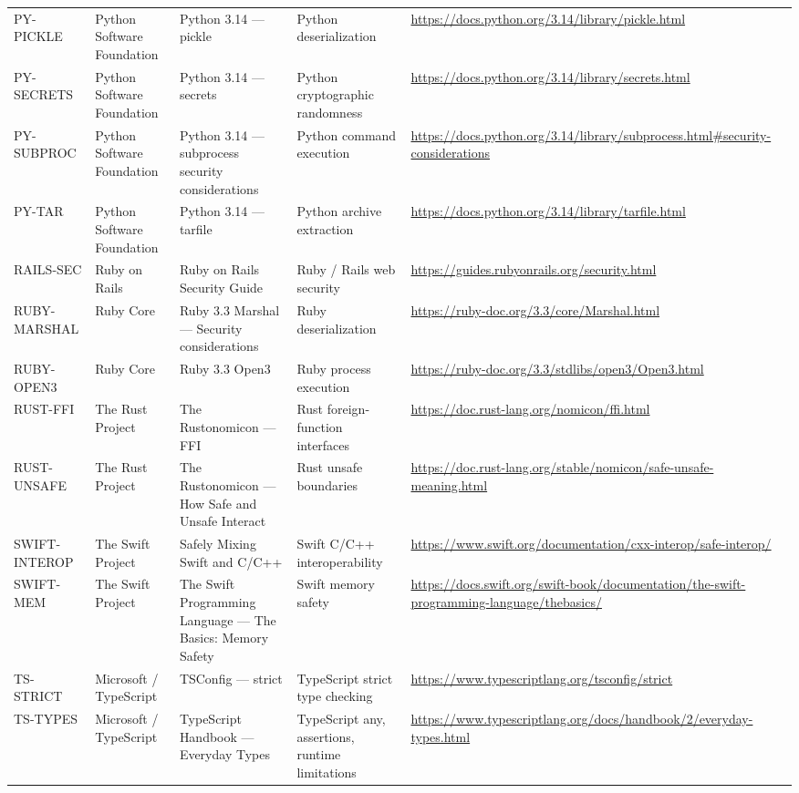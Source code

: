 \documentclass[10pt,letterpaper]{article}
\begin{document}
\begin{landscape}
\begin{longtable}{@{}P{0.82in}P{1.23in}P{2.25in}P{1.7in}P{3.0in}@{}}
PY-PICKLE & Python Software Foundation & Python 3.14 --- pickle & Python deserialization & \url{https://docs.python.org/3.14/library/pickle.html}\\
PY-SECRETS & Python Software Foundation & Python 3.14 --- secrets & Python cryptographic randomness & \url{https://docs.python.org/3.14/library/secrets.html}\\
PY-SUBPROC & Python Software Foundation & Python 3.14 --- subprocess security considerations & Python command execution & \url{https://docs.python.org/3.14/library/subprocess.html\#security-considerations}\\
PY-TAR & Python Software Foundation & Python 3.14 --- tarfile & Python archive extraction & \url{https://docs.python.org/3.14/library/tarfile.html}\\
RAILS-SEC & Ruby on Rails & Ruby on Rails Security Guide & Ruby / Rails web security & \url{https://guides.rubyonrails.org/security.html}\\
RUBY-MARSHAL & Ruby Core & Ruby 3.3 Marshal --- Security considerations & Ruby deserialization & \url{https://ruby-doc.org/3.3/core/Marshal.html}\\
RUBY-OPEN3 & Ruby Core & Ruby 3.3 Open3 & Ruby process execution & \url{https://ruby-doc.org/3.3/stdlibs/open3/Open3.html}\\
RUST-FFI & The Rust Project & The Rustonomicon --- FFI & Rust foreign-function interfaces & \url{https://doc.rust-lang.org/nomicon/ffi.html}\\
RUST-UNSAFE & The Rust Project & The Rustonomicon --- How Safe and Unsafe Interact & Rust unsafe boundaries & \url{https://doc.rust-lang.org/stable/nomicon/safe-unsafe-meaning.html}\\
SWIFT-INTEROP & The Swift Project & Safely Mixing Swift and C/C++ & Swift C/C++ interoperability & \url{https://www.swift.org/documentation/cxx-interop/safe-interop/}\\
SWIFT-MEM & The Swift Project & The Swift Programming Language --- The Basics: Memory Safety & Swift memory safety & \url{https://docs.swift.org/swift-book/documentation/the-swift-programming-language/thebasics/}\\
TS-STRICT & Microsoft / TypeScript & TSConfig --- strict & TypeScript strict type checking & \url{https://www.typescriptlang.org/tsconfig/strict}\\
TS-TYPES & Microsoft / TypeScript & TypeScript Handbook --- Everyday Types & TypeScript any, assertions, runtime limitations & \url{https://www.typescriptlang.org/docs/handbook/2/everyday-types.html}\\
\bottomrule
\end{longtable}
\normalsize
\end{landscape}
\end{document}
